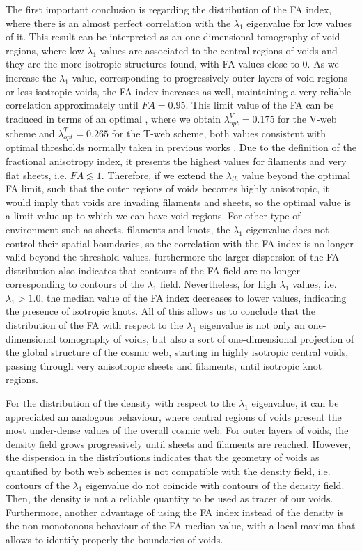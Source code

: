 \documentclass[a4,useAMS,usenatbib,usegraphicx]{latex/mn2e}
\begin{document}
The first important conclusion is regarding the distribution of the FA 
index, where there is an almost perfect correlation with the $\lambda_1$ 
eigenvalue for low values of it. This result can be interpreted as an 
one-dimensional tomography of void regions, where low $\lambda_1$ values 
are associated to the central regions of voids and they are the more 
isotropic structures found, with FA values close to 0. As we increase the 
$\lambda_1$ value, corresponding to progressively outer layers of void 
regions or less isotropic voids, the FA index increases as well, 
maintaining a very reliable correlation approximately until $FA=0.95$. 
This limit value of the FA can be traduced in terms of an optimal \lth, 
where we obtain $\lambda_{opt}^V = 0.175$ for the V-web scheme and 
$\lambda_{opt}^T = 0.265$ for the T-web scheme, both values consistent 
with optimal thresholds normally taken in previous works \SRKED{[references]}. 
Due to the definition of the fractional anisotropy index, it presents the 
highest values for filaments and very flat sheets, i.e. $FA\lesssim 1$.
Therefore, if we extend the $\lambda_{th}$ value beyond the optimal 
FA limit, such that the outer regions of voids becomes highly anisotropic, 
it would imply that voids are invading filaments and sheets, so the 
optimal \lth value is a limit value up to which we can have void regions. 
For other type of environment such as sheets, filaments and knots, the 
$\lambda_1$ eigenvalue does not control their spatial boundaries, so the 
correlation with the FA index is no longer valid beyond the threshold 
values, furthermore the larger dispersion of the FA distribution also 
indicates that contours of the FA field are no longer corresponding to 
contours of the $\lambda_1$ field. Nevertheless, for high $\lambda_1$ 
values, i.e. $\lambda_1>1.0$, the median value of the FA index decreases 
to lower values, indicating the presence of isotropic knots. All of this 
allows us to conclude that the distribution of the FA with respect to the 
$\lambda_1$ eigenvalue is not only an one-dimensional tomography of voids, 
but also a sort of one-dimensional projection of the global structure of 
the cosmic web, starting in highly isotropic central voids, passing 
through very anisotropic sheets and filaments, until isotropic knot 
regions.


For the distribution of the density with respect to the $\lambda_1$ 
eigenvalue, it can be appreciated an analogous behaviour, where central 
regions of voids present the most under-dense values of the overall cosmic 
web. For outer layers of voids, the density field grows progressively 
until sheets and filaments are reached. However, the dispersion in the 
distributions indicates that the geometry of voids as quantified by both 
web schemes is not compatible with the density field, i.e. contours of the
$\lambda_1$ eigenvalue do not coincide with contours of the density field. 
Then, the density is not a reliable quantity to be used as tracer of our 
voids. Furthermore, another advantage of using the FA index instead of the
density is the non-monotonous behaviour of the FA median value, with a 
local maxima that allows to identify properly the boundaries of voids.
\end{document}
